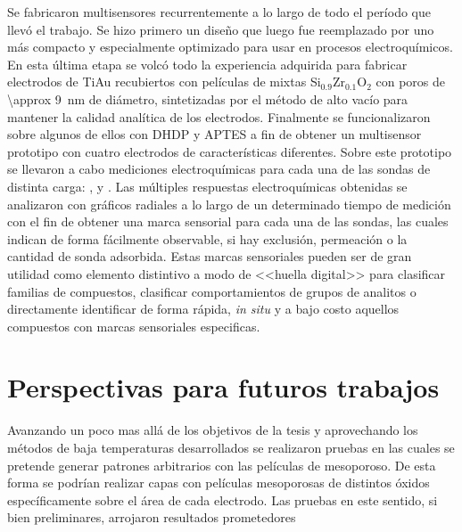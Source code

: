 Se fabricaron multisensores recurrentemente a lo largo de todo el período que llevó el trabajo. Se hizo primero un diseño que luego fue reemplazado por uno más compacto y especialmente optimizado para usar en procesos electroquímicos. En esta última etapa se volcó todo la experiencia adquirida para fabricar electrodos de Ti\textbar Au recubiertos con películas de mixtas Si$_{0.9}$Zr$_{0.1}$O$_2$ con poros de \SI{\approx 9}{\nm} de diámetro, sintetizadas por el método de alto vacío para mantener la calidad analítica de los electrodos. Finalmente se funcionalizaron sobre algunos de ellos con DHDP y APTES a fin de obtener un multisensor prototipo con cuatro electrodos de características diferentes. Sobre este prototipo se llevaron a cabo mediciones electroquímicas para cada una de las sondas de distinta carga: \ferroferri, \ferroceno\space y \aminorutenio. Las múltiples respuestas electroquímicas obtenidas se analizaron con gráficos radiales a lo largo de un determinado tiempo de medición con el fin de obtener una marca sensorial para cada una de las sondas, las cuales indican de forma fácilmente observable, si hay exclusión, permeación o la cantidad de sonda adsorbida. Estas marcas sensoriales pueden ser de gran utilidad como elemento distintivo a modo de <<huella digital>> para clasificar familias de compuestos, clasificar comportamientos de grupos de analitos o directamente identificar de forma rápida, \textit{in situ} y a bajo costo aquellos compuestos con marcas sensoriales especificas.





\section{Perspectivas para futuros trabajos}


Avanzando un poco mas allá de los objetivos de la tesis y aprovechando los métodos de baja temperaturas desarrollados se realizaron pruebas en las cuales se pretende generar patrones arbitrarios con las películas de mesoporoso. De esta forma se podrían realizar capas con películas mesoporosas de distintos óxidos específicamente sobre el área de cada electrodo. Las pruebas en este sentido, si bien preliminares, arrojaron resultados prometedores

